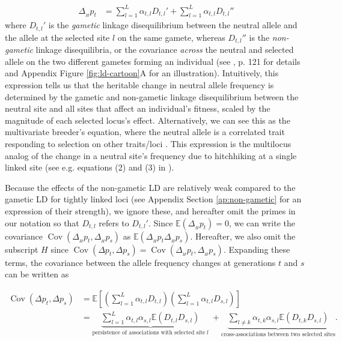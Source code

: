 \documentclass[11pt]{article}
\newcommand{\nnn}{\nonumber}
\newcommand{\E}{\mathbb{E}}
\DeclareMathOperator{\cov}{Cov}
\begin{document}
\begin{align}
  \Delta_{_H} p_t &=  \sum_{l=1}^L \alpha_{t,l} D_{t,l}' + \sum_{l=1}^L \alpha_{t,l} D_{t,l}'' 
\label{eq:neut-change}
\end{align}
%
where $D_{t,l}'$ is the \emph{gametic} linkage disequilibrium between the
neutral allele and the allele at the selected site $l$ on the same gamete,
whereas $D_{t,l}''$ is the \emph{non-gametic} linkage disequilibria, or the
covariance \emph{across} the neutral and selected allele on the two different
gametes forming an individual (see \cite{Weir1996-mv}, p. 121 for details and
Appendix Figure \ref{fig:ld-cartoon}A for an illustration). Intuitively, this
expression tells us that the heritable change in neutral allele frequency is
determined by the gametic and non-gametic linkage disequilibrium between the
neutral site and all sites that affect an individual's fitness, scaled by the
magnitude of each selected locus's effect. Alternatively, we can see this as
the multivariate breeder's equation, where the neutral allele is a correlated
trait responding to selection on other traits/loci \parencite{Lande1979-rq}.
This expression is the multilocus analog of the change in a neutral site's
frequency due to hitchhiking at a single linked site (see e.g. equations (2)
and (3) in \cite{Stephan2006-xz}). 

Because the effects of the non-gametic LD are relatively weak compared to the
gametic LD for tightly linked loci (see Appendix Section \ref{ap:non-gametic}
for an expression of their strength), we ignore these, and hereafter omit the
primes in our notation so that $D_{t,l}$ refers to $D_{t,l}'$.  Since
$\E(\Delta_{_H} p_t) = 0$, we can write the covariance $\cov(\Delta_{_H} p_t,
\Delta_{_H} p_s)$ as $\E(\Delta_{_H} p_t \Delta_{_H} p_s)$.  Hereafter, we also
omit the subscript $H$ since $\cov(\Delta p_t, \Delta p_s) = \cov(\Delta_{_H}
p_t, \Delta_{_H} p_s)$. Expanding these terms, the covariance between the
allele frequency changes at generations $t$ and $s$ can be written as

\begin{align}
  \cov(\Delta p_t, \Delta p_s) &=  \E \left[\left(\sum_{l=1}^L \alpha_{t,l} D_{t,l}\right) \left( \sum_{l=1}^L \alpha_{t,l} D_{s,l} \right) \right]\nnn \\ 
                               &=  \underbrace{\sum_{l=1}^L \alpha_{t,l} \alpha_{s,l} \E(D_{t,l}  D_{s,l})}_{\text{persistence of associations with selected site} \; l}  \; + 
  \underbrace{\sum_{l \ne k} \alpha_{t,k} \alpha_{s,l}\E(D_{t,k}  D_{s,l})}_{\text{cross-associations between two selected sites}}. 
  \label{eq:multilocus-twopart}
\end{align}
\end{document}
